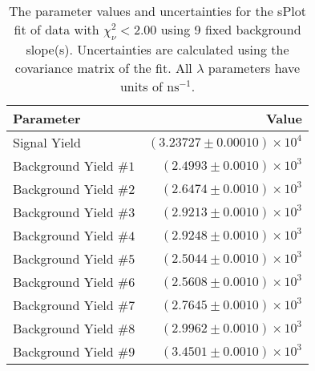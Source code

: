 
\begin{table}
    \begin{center}
        \begin{tabular}{lr}\toprule
            Parameter & Value \\\midrule
            Signal Yield & $(3.23727 \pm 0.00010) \times 10^{4}$ \\
            Background Yield $\#1$ & $(2.4993 \pm 0.0010) \times 10^{3}$ \\
            Background Yield $\#2$ & $(2.6474 \pm 0.0010) \times 10^{3}$ \\
            Background Yield $\#3$ & $(2.9213 \pm 0.0010) \times 10^{3}$ \\
            Background Yield $\#4$ & $(2.9248 \pm 0.0010) \times 10^{3}$ \\
            Background Yield $\#5$ & $(2.5044 \pm 0.0010) \times 10^{3}$ \\
            Background Yield $\#6$ & $(2.5608 \pm 0.0010) \times 10^{3}$ \\
            Background Yield $\#7$ & $(2.7645 \pm 0.0010) \times 10^{3}$ \\
            Background Yield $\#8$ & $(2.9962 \pm 0.0010) \times 10^{3}$ \\
            Background Yield $\#9$ & $(3.4501 \pm 0.0010) \times 10^{3}$ \\\bottomrule
        \end{tabular}
        \caption{The parameter values and uncertainties for the sPlot fit of data with $\chi^2_\nu < 2.00$ using 9 fixed background slope(s). Uncertainties are calculated using the covariance matrix of the fit. All $\lambda$ parameters have units of $\si{\nano\second}^{-1}$.}
    \end{center}
\end{table}
